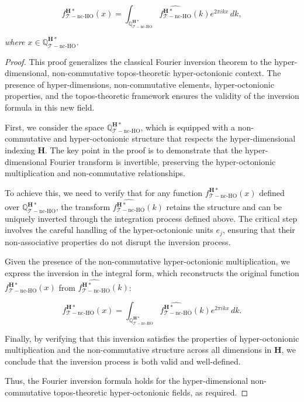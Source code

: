 \documentclass{article}
\begin{document}
\[
f_{\mathcal{T}-\text{nc-HO}}^{\mathbf{H}*}(x) = \int_{\mathbb{Q}_{\mathcal{T}-\text{nc-HO}}^{\mathbf{H}*}} \widehat{f_{\mathcal{T}-\text{nc-HO}}^{\mathbf{H}*}}(k) e^{2\pi i k x} \, dk,
\]

\textit{where \(x \in \mathbb{Q}_{\mathcal{T}-\text{nc-HO}}^{\mathbf{H}*}\).}
 
\begin{proof}
This proof generalizes the classical Fourier inversion theorem to the hyper-dimensional, non-commutative topos-theoretic hyper-octonionic context. The presence of hyper-dimensions, non-commutative elements, hyper-octonionic properties, and the topos-theoretic framework ensures the validity of the inversion formula in this new field.

First, we consider the space \( \mathbb{Q}_{\mathcal{T}-\text{nc-HO}}^{\mathbf{H}*} \), which is equipped with a non-commutative and hyper-octonionic structure that respects the hyper-dimensional indexing \( \mathbf{H} \). The key point in the proof is to demonstrate that the hyper-dimensional Fourier transform is invertible, preserving the hyper-octonionic multiplication and non-commutative relationships.

To achieve this, we need to verify that for any function \( f_{\mathcal{T}-\text{nc-HO}}^{\mathbf{H}*}(x) \) defined over \( \mathbb{Q}_{\mathcal{T}-\text{nc-HO}}^{\mathbf{H}*} \), the transform \( \widehat{f_{\mathcal{T}-\text{nc-HO}}^{\mathbf{H}*}}(k) \) retains the structure and can be uniquely inverted through the integration process defined above. The critical step involves the careful handling of the hyper-octonionic units \( e_j \), ensuring that their non-associative properties do not disrupt the inversion process.

Given the presence of the non-commutative hyper-octonionic multiplication, we express the inversion in the integral form, which reconstructs the original function \( f_{\mathcal{T}-\text{nc-HO}}^{\mathbf{H}*}(x) \) from \( \widehat{f_{\mathcal{T}-\text{nc-HO}}^{\mathbf{H}*}}(k) \):

\[
f_{\mathcal{T}-\text{nc-HO}}^{\mathbf{H}*}(x) = \int_{\mathbb{Q}_{\mathcal{T}-\text{nc-HO}}^{\mathbf{H}*}} \widehat{f_{\mathcal{T}-\text{nc-HO}}^{\mathbf{H}*}}(k) e^{2\pi i k x} \, dk.
\]

Finally, by verifying that this inversion satisfies the properties of hyper-octonionic multiplication and the non-commutative structure across all dimensions in \( \mathbf{H} \), we conclude that the inversion process is both valid and well-defined.

Thus, the Fourier inversion formula holds for the hyper-dimensional non-commutative topos-theoretic hyper-octonionic fields, as required.
\end{proof}
\end{document}

